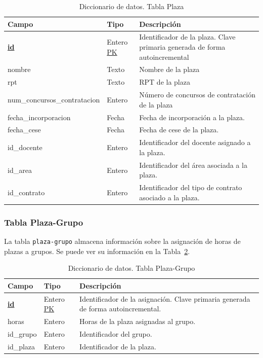 \begin{table}
  \centering 
  \begin{tabular}{l p{} p{}}
    \toprule
    \textbf{Campo} & \textbf{Tipo} & \textbf{Descripción}\\
    \midrule
    \textbf{\underline{id}} & Entero \underline{PK} & Identificador de la plaza. Clave primaria generada de forma autoincremental \\ \addlinespace
    nombre & Texto & Nombre de la plaza \\ \addlinespace
    rpt & Texto & RPT de la plaza \\ \addlinespace
    num\_concursos\_contratacion & Entero & Número de concursos de contratación de la plaza \\ \addlinespace
    fecha\_incorporacion & Fecha & Fecha de incorporación a la plaza. \\ \addlinespace
    fecha\_cese & Fecha & Fecha de cese de la plaza. \\ \addlinespace
    id\_docente & Entero & Identificador del docente asignado a la plaza. \\ \addlinespace
    id\_area & Entero & Identificador del área asociada a la plaza. \\ \addlinespace
    id\_contrato & Entero & Identificador del tipo de contrato asociado a la plaza. \\
    \bottomrule
  \end{tabular}
  \caption{Diccionario de datos. Tabla Plaza}
  \label{tab:diccionario_plaza}
\end{table}

\subsubsection{Tabla Plaza-Grupo}
La tabla \texttt{plaza-grupo} almacena información sobre la asignación de horas de plazas a grupos. Se puede ver su información en la Tabla~\ref{tab:diccionario_plaza_grupo}.

\begin{table}
  \centering 
  \begin{tabular}{l p{} p{}}
    \toprule
    \textbf{Campo} & \textbf{Tipo} & \textbf{Descripción}\\
    \midrule
    \textbf{\underline{id}} & Entero \underline{PK} & Identificador de la asignación. Clave primaria generada de forma autoincremental. \\ \addlinespace
    horas & Entero & Horas de la plaza asignadas al grupo. \\ \addlinespace
    id\_grupo & Entero & Identificador del grupo. \\ \addlinespace
    id\_plaza & Entero & Identificador de la plaza. \\
    \bottomrule
  \end{tabular}
  \caption{Diccionario de datos. Tabla Plaza-Grupo}
  \label{tab:diccionario_plaza_grupo}
\end{table}


